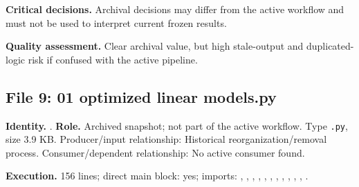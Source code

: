 \documentclass[
  11pt,
  a4paper]{article}
\begin{document}
\textbf{Critical decisions.} Archival decisions may differ from the
active workflow and must not be used to interpret current frozen
results.

\textbf{Quality assessment.} Clear archival value, but high stale-output
and duplicated-logic risk if confused with the active pipeline.

\subsection{File 9: 01 optimized linear
models.py}\label{file-2427652491462754995}

\textbf{Identity.}
.
\textbf{Role.} Archived snapshot; not part of the active workflow. Type
\texttt{.py}, size 3.9 KB. Producer/input relationship: Historical
reorganization/removal process. Consumer/dependent relationship: No
active consumer found.

\textbf{Execution.} 156 lines; direct main block: yes; imports:
, , ,
,
,
,
,
,
,
,
, .
\end{document}
